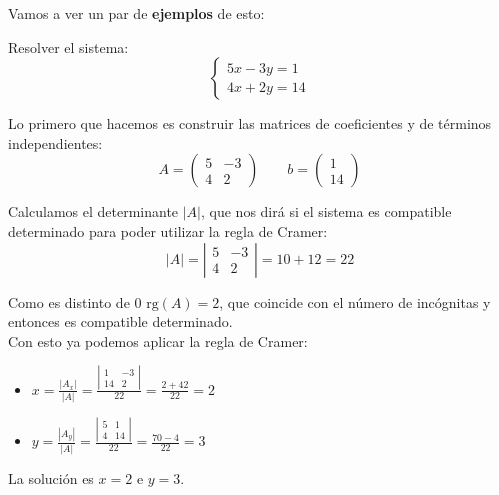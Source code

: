 \documentclass[a4paper,11pt,answers]{exam}
\newcommand\rango[1]{\mathrm{rg}(#1)}
\begin{document}
Vamos a ver un par de \textbf{ejemplos} de esto:
\begin{questions}
\question Resolver el sistema:
\[\left\lbrace\begin{array}{lll}
	5x-3y = 1\\
	4x+2y =14
\end{array}\right.\]
\begin{solution}
	Lo primero que hacemos es construir las matrices de coeficientes y de términos independientes:
	\[A=\left(\begin{array}{rr}
		5&-3\\
		4&2
	\end{array}\right)\quad\quad b=\left(\begin{array}{r}
	1\\14
\end{array}\right)\]

Calculamos el determinante $|A|$, que nos dirá si el sistema es compatible determinado para poder utilizar la regla de Cramer:
\[|A| = \left|\begin{array}{rr}
		5&-3\\
		4&2
\end{array}\right| = 10 +12 = 22\]

Como es distinto de 0 $\rango{A} = 2$, que coincide con el número de incógnitas y entonces es compatible determinado.\\

Con esto ya podemos aplicar la regla de Cramer:
\begin{itemize}
	\item $x = \frac{|A_x|}{|A|} = \frac{\left|\begin{array}{rr}
			1&-3\\
			14&2
		\end{array}\right|}{22} = \frac{2+42}{22} = 2$
	\item $y = \frac{|A_y|}{|A|} = \frac{\left|\begin{array}{rr}
			5&1\\
			4&14
		\end{array}\right|}{22} = \frac{70-4}{22} = 3$
\end{itemize}

La solución es $x=2$ e $y=3$.
\end{solution}


\end{questions}
\end{document}
